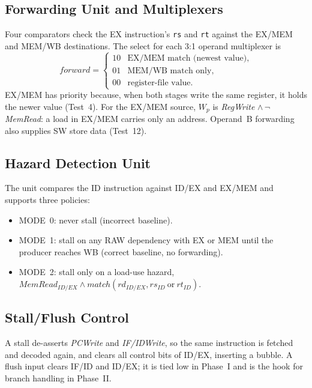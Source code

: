 \documentclass[conference]{IEEEtran}
\begin{document}
\subsection{Forwarding Unit and Multiplexers}
Four comparators check the EX instruction's \texttt{rs} and \texttt{rt} against the EX/MEM and MEM/WB destinations. The select for each 3:1 operand multiplexer is
\[
\mathit{forward} =
\begin{cases}
10 & \text{EX/MEM match (newest value)},\\
01 & \text{MEM/WB match only},\\
00 & \text{register-file value}.
\end{cases}
\]
EX/MEM has priority because, when both stages write the same register, it holds the newer value (Test~4). For the EX/MEM source, $W_p$ is \textit{RegWrite} $\land\,\lnot$\textit{MemRead}: a load in EX/MEM carries only an address. Operand~B forwarding also supplies SW store data (Test~12).

\subsection{Hazard Detection Unit}
The unit compares the ID instruction against ID/EX and EX/MEM and supports three policies:
\begin{itemize}
\item MODE~0: never stall (incorrect baseline).
\item MODE~1: stall on any RAW dependency with EX or MEM until the producer reaches WB (correct baseline, no forwarding).
\item MODE~2: stall only on a load-use hazard, $\mathit{MemRead}_{ID/EX} \land \mathit{match}(rd_{ID/EX}, rs_{ID}\ \text{or}\ rt_{ID})$.
\end{itemize}

\subsection{Stall/Flush Control}
A stall de-asserts \textit{PCWrite} and \textit{IF/IDWrite}, so the same instruction is fetched and decoded again, and clears all control bits of ID/EX, inserting a bubble. A flush input clears IF/ID and ID/EX; it is tied low in Phase~I and is the hook for branch handling in Phase~II.
\end{document}
